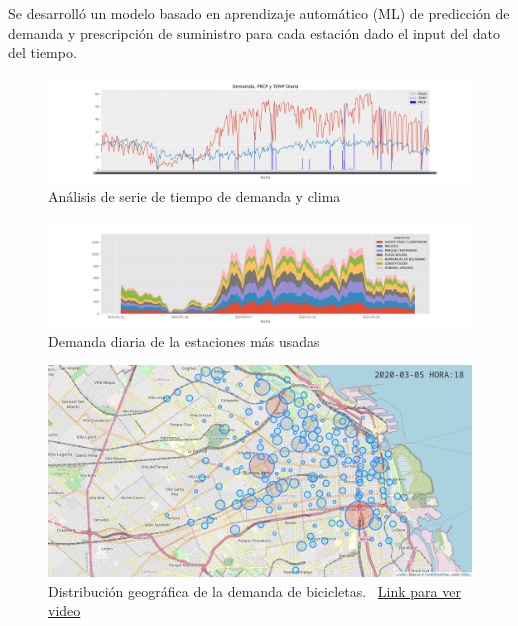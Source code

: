 \documentclass[runningheads,a4paper,spanish]{llncs}
\begin{document}
Se desarrolló un modelo basado en aprendizaje automático (ML) de predicción de
demanda y prescripción de suministro para cada estación dado el input del dato
del tiempo.

\begin{figure}[ht]
  \centering
  \includegraphics[width=\linewidth]{imgs/clima.png}
  \caption{Análisis de serie de tiempo de demanda y clima}
\end{figure}

\begin{figure}[ht]
  \centering
  \includegraphics[width=\linewidth]{imgs/demandaA.png}
  \caption{Demanda diaria de la estaciones más usadas}
\end{figure}

\begin{figure}[ht]
  \centering
  \includegraphics[width=\linewidth]{imgs/dia-de-mayor-demanda.png}
  \caption{Distribución geográfica de la demanda de bicicletas. ~\href{https://www.youtube.com/watch?v=_muR3drqs_Y}{Link para ver video}}
\end{figure}


\newpage


\end{document}

